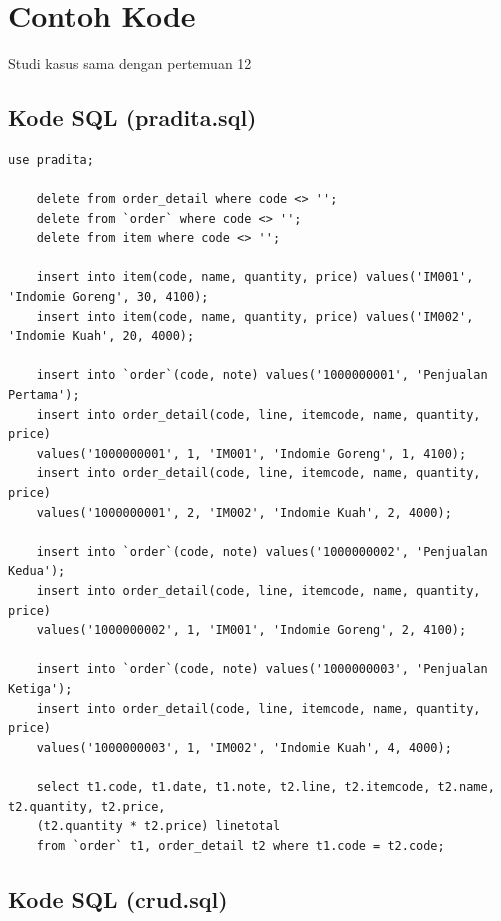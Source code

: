 \section{Contoh Kode}

Studi kasus sama dengan pertemuan 12

\subsection{Kode SQL (pradita.sql)}

\begin{lstlisting}[style=JavaStyle]
	use pradita;
	
	delete from order_detail where code <> '';
	delete from `order` where code <> '';
	delete from item where code <> '';
	
	insert into item(code, name, quantity, price) values('IM001', 'Indomie Goreng', 30, 4100);
	insert into item(code, name, quantity, price) values('IM002', 'Indomie Kuah', 20, 4000);
	
	insert into `order`(code, note) values('1000000001', 'Penjualan Pertama');
	insert into order_detail(code, line, itemcode, name, quantity, price) 
	values('1000000001', 1, 'IM001', 'Indomie Goreng', 1, 4100);
	insert into order_detail(code, line, itemcode, name, quantity, price) 
	values('1000000001', 2, 'IM002', 'Indomie Kuah', 2, 4000);
	
	insert into `order`(code, note) values('1000000002', 'Penjualan Kedua');
	insert into order_detail(code, line, itemcode, name, quantity, price) 
	values('1000000002', 1, 'IM001', 'Indomie Goreng', 2, 4100);
	
	insert into `order`(code, note) values('1000000003', 'Penjualan Ketiga');
	insert into order_detail(code, line, itemcode, name, quantity, price) 
	values('1000000003', 1, 'IM002', 'Indomie Kuah', 4, 4000);
	
	select t1.code, t1.date, t1.note, t2.line, t2.itemcode, t2.name, t2.quantity, t2.price, 
	(t2.quantity * t2.price) linetotal
	from `order` t1, order_detail t2 where t1.code = t2.code;
\end{lstlisting}


\subsection{Kode SQL (crud.sql)}

